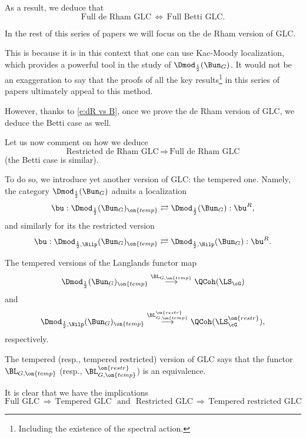 \documentclass[9pt]{amsart}
\theoremstyle{remark}
\theoremstyle{definition}
\theoremstyle{remark}
\numberwithin{equation}{section}
\begin{document}
As a result, we deduce that
\begin{equation} \label{e:dR vs B}
\text{Full de Rham GLC}\, \Leftrightarrow\, \text{Full Betti GLC}.
\end{equation} 

\sssec{}

In the rest of this series of papers we will focus on the de Rham version of GLC. 

\medskip

This is because it is 
in this context that one can use Kac-Moody localization, which provides a powerful tool
in the study of $\Dmod_{\frac{1}{2}}(\Bun_G)$. It would not be an exaggeration to say that the proofs
of all the key results\footnote{Including the existence of the spectral action.} 
in this series of papers ultimately appeal to this method.

\medskip

However, thanks to \eqref{e:dR vs B}, once we prove the de Rham version of GLC, we 
deduce the Betti case as well. 

\sssec{} \label{sss:restr implies Intro}

Let us now comment on how we deduce 
$$\text{Restricted de Rham GLC}\, \Rightarrow \, \text{Full de Rham GLC}$$
(the Betti case is similar).

\medskip

To do so, we introduce yet another version of GLC: the tempered one. Namely, the category $\Dmod_{\frac{1}{2}}(\Bun_G)$
admits a localization
$$\bu:\Dmod_{\frac{1}{2}}(\Bun_G)_{\on{temp}} \rightleftarrows \Dmod_{\frac{1}{2}}(\Bun_G):\bu^R,$$
and similarly for its the restricted version
$$\bu:\Dmod_{\frac{1}{2},\Nilp}(\Bun_G)_{\on{temp}} \rightleftarrows \Dmod_{\frac{1}{2},\Nilp}(\Bun_G):\bu^R.$$

The tempered versions of the Langlands functor map
$$\Dmod_{\frac{1}{2}}(\Bun_G)_{\on{temp}}  \overset{\BL_{G,\on{temp}}}\longrightarrow \QCoh(\LS_\cG)$$
and 
$$\Dmod_{\frac{1}{2},\Nilp}(\Bun_G)_{\on{temp}}  \overset{\BL^{\on{restr}}_{G,\on{temp}}}\longrightarrow \QCoh(\LS^{\on{restr}}_\cG),$$
respectively.

\medskip

The tempered (resp., tempered restricted) version of GLC says that the functor $\BL_{G,\on{temp}}$ (resp., $\BL^{\on{restr}}_{G,\on{temp}}$)
is an equivalence. 

\sssec{}

It is clear that we have the implications
$$\text{Full GLC} \, \Rightarrow \, \text{Tempered GLC} \,\,\text{  and  }\,\, 
\text{Restricted GLC} \, \Rightarrow \, \text{Tempered restricted GLC}$$
\end{document}

